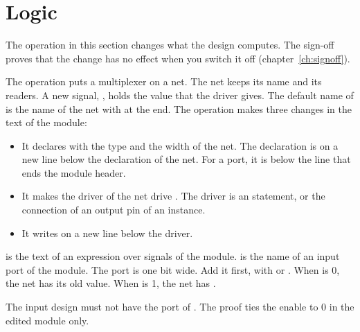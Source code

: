 \section{Logic}
\label{sec:logic}

The operation in this section changes what the design computes. The sign-off proves that
the change has no effect when you switch it off (chapter~\ref{ch:signoff}).

\begin{entry}{}
\item[Writes] The operation puts a multiplexer on a net. The net keeps its name and its
  readers. A new signal, , holds the value that the driver gives. The default
  name of  is the name of the net with  at the end. The operation
  makes three changes in the text of the module:
  \begin{itemize}
  \item It declares  with the type and the width of the net. The declaration is
    on a new line below the declaration of the net. For a port, it is below the line
    that ends the module header.
  \item It makes the driver of the net drive . The driver is an 
    statement, or the connection of an output pin of an instance.
  \item It writes  on a new line below the
    driver.
  \end{itemize}
   is the text of an expression over signals of the module.  is
  the name of an input port of the module. The port is one bit wide. Add it first, with
   or . When  is 0, the net
  has its old value. When  is 1, the net has .

  The input design must not have the port of . The proof ties the enable to 0
  in the edited module only.


\end{entry}
